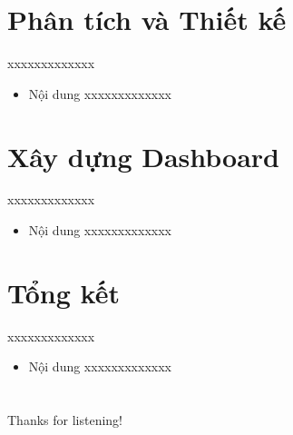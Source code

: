 \documentclass{beamer}
\begin{document}
\section{Phân tích và Thiết kế}
\begin{frame}{xxxxxxxxxxxxx}
\begin{itemize}
\item Nội dung xxxxxxxxxxxxx
\end{itemize}
\end{frame}
\section{Xây dựng Dashboard}
\begin{frame}{xxxxxxxxxxxxx}
\begin{itemize}
\item Nội dung xxxxxxxxxxxxx
\end{itemize}
\end{frame}
\section{Tổng kết}
\begin{frame}{xxxxxxxxxxxxx}
\begin{itemize}
\item Nội dung xxxxxxxxxxxxx
\end{itemize}
\end{frame}

\section*{}
\begin{frame}{}
\centering
\Huge{Thanks for listening!}
\end{frame}
\end{document}

